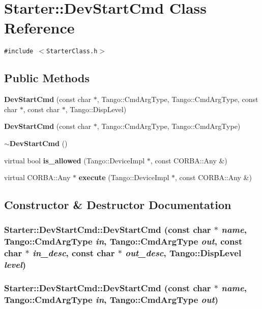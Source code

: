 \section{Starter::Dev\-Start\-Cmd  Class Reference}
\label{classStarter_1_1DevStartCmd}
{\tt \#include $<$Starter\-Class.h$>$}

\subsection*{Public Methods}
\begin{CompactItemize}
\item 
{\bf Dev\-Start\-Cmd} (const char $\ast$, Tango::Cmd\-Arg\-Type, Tango::Cmd\-Arg\-Type, const char $\ast$, const char $\ast$, Tango::Disp\-Level)
\item 
{\bf Dev\-Start\-Cmd} (const char $\ast$, Tango::Cmd\-Arg\-Type, Tango::Cmd\-Arg\-Type)
\item 
{\bf $\sim$Dev\-Start\-Cmd} ()
\item 
virtual bool {\bf is\_\-allowed} (Tango::Device\-Impl $\ast$, const CORBA::Any \&)
\item 
virtual CORBA::Any $\ast$ {\bf execute} (Tango::Device\-Impl $\ast$, const CORBA::Any \&)
\end{CompactItemize}


\subsection{Constructor \& Destructor Documentation}
\subsubsection{\setlength{\rightskip}{0pt plus 5cm}Starter::Dev\-Start\-Cmd::Dev\-Start\-Cmd (const char $\ast$ {\em name}, Tango::Cmd\-Arg\-Type {\em in}, Tango::Cmd\-Arg\-Type {\em out}, const char $\ast$ {\em in\_\-desc}, const char $\ast$ {\em out\_\-desc}, Tango::Disp\-Level {\em level})}\label{classStarter_1_1DevStartCmd_a0}


\subsubsection{\setlength{\rightskip}{0pt plus 5cm}Starter::Dev\-Start\-Cmd::Dev\-Start\-Cmd (const char $\ast$ {\em name}, Tango::Cmd\-Arg\-Type {\em in}, Tango::Cmd\-Arg\-Type {\em out})}\label{classStarter_1_1DevStartCmd_a1}


